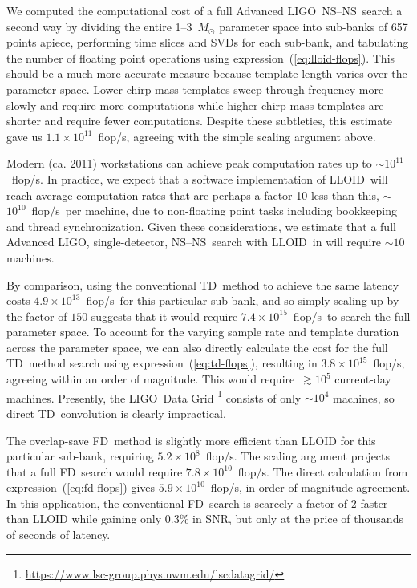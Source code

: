 \documentclass[preprint2]{aastex}
\newcommand{\NS}{NS}
\newcommand{\LIGO}{LIGO}%
\newcommand{\SNR}{SNR}%
\newcommand{\flops}{flop/s}
\newcommand{\lloid}{LLOID}%
\newcommand{\TD}{TD}%
\newcommand{\FD}{FD}%
\begin{document}
We computed the computational cost of a full Advanced \LIGO\ \NS--\NS\ search a
second way by dividing the entire 1--3~$M_\odot$ parameter space into sub-banks
of 657 points apiece, performing time slices and SVDs for each sub-bank, and
tabulating the number of floating point operations using
expression~(\ref{eq:lloid-flops}).  This should be a much more accurate measure
because template length varies over the parameter space.  Lower chirp mass
templates sweep through frequency more slowly and require more computations
while higher chirp mass templates are shorter and require fewer computations.
Despite these subtleties, this estimate gave us $1.1 \times 10^{11}$~\flops,
agreeing with the simple scaling argument above.

Modern (ca. 2011) workstations can achieve peak
computation rates up to $\sim$$10^{11}$~\flops.  In practice, we expect that a
software implementation of \lloid\ will reach average computation rates that are
perhaps a factor 10 less than this, $\sim$$10^{10}$~\flops\ per machine, due to
non-floating point tasks including bookkeeping and thread synchronization.
Given these considerations, we estimate that a full Advanced
\LIGO, single-detector, \NS--\NS\ search with \lloid\ in will require $\sim$$10$ machines.

By comparison, using the conventional \TD\ method to achieve the same latency costs
$4.9 \times 10^{13}$~\flops\ for this particular sub-bank, and so simply scaling up by the factor of $150$ suggests that it would require $7.4 \times 10^{15}$~\flops\
to search the full parameter space.  To account for the varying sample rate and template duration across the parameter space, we can also directly calculate the cost for the full \TD\ method search using expression~(\ref{eq:td-flops}), resulting in $3.8 \times 10^{15}$~\flops, agreeing within an order of magnitude.  This would require~$\gtrsim$$10^5$ current-day machines.  Presently, the \LIGO\ Data Grid%
\footnote{\url{https://www.lsc-group.phys.uwm.edu/lscdatagrid/}} consists of
only $\sim$$10^4$ machines, so direct \TD\ convolution is clearly impractical.

The overlap-save \FD\ method is slightly more efficient than LLOID for this particular sub-bank, requiring $5.2 \times 10^8$~\flops.  The scaling argument projects that a full \FD\ search would require $7.8 \times 10^{10}$~\flops.  The direct calculation from expression~(\ref{eq:fd-flops}) gives $5.9 \times 10^{10}$~\flops, in order-of-magnitude agreement.  In this application, the conventional \FD\ search is scarcely a factor of 2 faster than LLOID while gaining only $0.3$\% in \SNR, but only at the price of thousands of seconds of latency.
\end{document}

